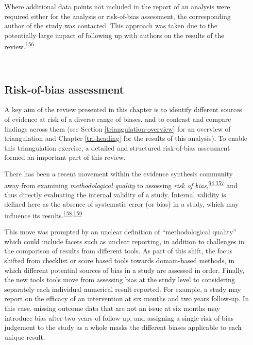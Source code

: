 \documentclass[a4paper, twoside]{templates/ociamthesis}
\begin{document}
Where additional data points not included in the report of an analysis were required either for the analysis or risk-of-bias assessment, the corresponding author of the study was contacted. This approach was taken due to the potentially large impact of following up with authors on the results of the review.\textsuperscript{\protect\hyperlink{ref-reynders2019}{156}}

~

\hypertarget{risk-of-bias}{%
\subsection{Risk-of-bias assessment}\label{risk-of-bias}}

A key aim of the review presented in this chapter is to identify different sources of evidence at risk of a diverse range of biases, and to contrast and compare findings across them (see Section \ref{triangulation-overview} for an overview of triangulation and Chapter \ref{tri-heading} for the results of this analysis). To enable this triangulation exercise, a detailed and structured risk-of-bias assessment formed an important part of this review.

There has been a recent movement within the evidence synthesis community away from examining \emph{methodological quality} to assessing \emph{risk of bias},\textsuperscript{\protect\hyperlink{ref-mcguinness2018}{94},\protect\hyperlink{ref-sterne2016}{157}} and thus directly evaluating the internal validity of a study. Internal validity is defined here as the absence of systematic error (or bias) in a study, which may influence its results.\textsuperscript{\protect\hyperlink{ref-campbell1957}{158},\protect\hyperlink{ref-juni2001}{159}}

This move was prompted by an unclear definition of ``methodological quality'' which could include facets such as unclear reporting, in addition to challenges in the comparison of results from different tools. As part of this shift, the focus shifted from checklist or score based tools towards domain-based methods, in which different potential sources of bias in a study are assessed in order.
Finally, the new tools tools move from assessing bias at the study level to considering separately each individual numerical result reported. For example, a study may report on the efficacy of an intervention at six months and two years follow-up. In this case, missing outcome data that are not an issue at six months may introduce bias after two years of follow-up, and assigning a single risk-of-bias judgement to the study as a whole masks the different biases applicable to each unique result.
\end{document}
